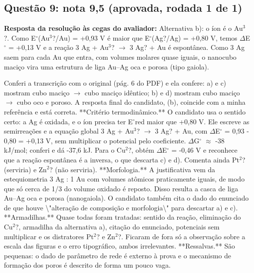 \documentclass{article}%
\begin{document}
\subsection*{Questão 9: nota 9,5 (aprovada, rodada 1 de 1)}%
\textbf{Resposta da resolução às cegas do avaliador:} Alternativa b): o íon é o Au$^3$?. Como E$^\circ$(Au$^3$?/Au) = +0,93 V é maior que E$^\circ$(Ag?/Ag) = +0,80 V, temos $\Delta$E$^\circ$ = +0,13 V e a reação 3 Ag + Au$^3$? $\to$ 3 Ag? + Au é espontânea. Como 3 Ag saem para cada Au que entra, com volumes molares quase iguais, o nanocubo maciço vira uma estrutura de liga Au--Ag oca e porosa (tipo gaiola).\par %
Conferi a transcrição com o original (pág. 6 do PDF) e ela confere: a) e c) mostram cubo maciço $\to$ cubo maciço idêntico; b) e d) mostram cubo maciço $\to$ cubo oco e poroso. A resposta final do candidato, (b), coincide com a minha referência e está correta.\newline%
\newline%
**Critério termodinâmico.** O candidato usa o sentido certo: a Ag é oxidada, e o íon precisa ter E$^\circ$red maior que +0,80 V. Ele escreve as semirreações e a equação global 3 Ag + Au$^3$? $\to$ 3 Ag? + Au, com $\Delta$E$^\circ$ = 0,93 - 0,80 = +0,13 V, sem multiplicar o potencial pelo coeficiente. $\Delta$G$^\circ$ $\approx$ -38 kJ/mol; conferi e dá -37,6 kJ. Para o Cu$^2$?, obtém $\Delta$E$^\circ$ = -0,46 V e reconhece que a reação espontânea é a inversa, o que descarta c) e d). Comenta ainda Pt$^2$? (serviria) e Zn$^2$? (não serviria).\newline%
\newline%
**Morfologia.** A justificativa vem da estequiometria 3 Ag : 1 Au com volumes atômicos praticamente iguais, de modo que só cerca de 1/3 do volume oxidado é reposto. Disso resulta a casca de liga Au--Ag oca e porosa (nanogaiola). O candidato também cita o dado do enunciado de que houve \textbackslash{}"alteração de composição e morfologia\textbackslash{}" para descartar a) e c).\newline%
\newline%
**Armadilhas.** Quase todas foram tratadas: sentido da reação, eliminação do Cu$^2$?, armadilha da alternativa a), citação do enunciado, potenciais sem multiplicar e os distratores Pt$^2$? e Zn$^2$?. Ficaram de fora só a observação sobre a escala das figuras e o erro tipográfico, ambos irrelevantes.\newline%
\newline%
**Ressalvas.** São pequenas: o dado de parâmetro de rede é externo à prova e o mecanismo de formação dos poros é descrito de forma um pouco vaga.\newline%
\end{document}
